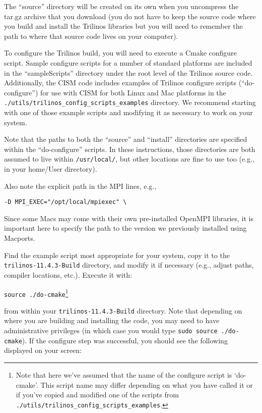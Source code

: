 The ``source'' directory will be created on its own when you uncompress the tar.gz archive 
that you download (you do not have to keep the source code where you build and install 
the Trilinos libraries but you will need to remember the path to where that source code 
lives on your computer). 

To configure the Trilinos build, you will need to execute a Cmake configure script. 
Sample configure scripts for a number of standard platforms are included in the ``sampleScripts''
 directory under the root level of the Trilinos source code. 
Additionally, the CISM code includes examples of Trilinos configure scripts (``do-configure'') 
for use with CISM for both Linux and Mac platforms in the 
\texttt{./utils/trilinos\_config\_scripts\_examples} directory. 
We recommend starting with one of those example scripts and modifying it as
necessary to work on your system.

Note that the paths to both the ``source'' and ``install'' directories are specified within the ``do-configure'' scripts. In these instructions, those directories are both assumed to live within \texttt{/usr/local/},
but other locations are fine to use too (e.g., in your home/User directory).

\begin{mdframed}[style=mac] %
Also note the explicit path in the MPI lines, e.g.,

\begin{verbatim}
-D MPI_EXEC="/opt/local/mpiexec" \
\end{verbatim}

Since some Macs may come with their own pre-installed OpenMPI libraries, it is important here to specify the path to the version we previously installed using Macports.
\end{mdframed}              %

Find the example script most appropriate for your system, copy it to the \texttt{trilinos-11.4.3-Build} directory, and modify it if necessary (e.g., adjust paths, compiler locations, etc.).
Execute it with: 

\texttt{source ./do-cmake}\footnote{Note that here we've assumed that the name of the configure script is `do-cmake'. This script name may differ depending on what you have called it or if you've copied and modified one of the scripts from \texttt{./utils/trilinos\_config\_scripts\_examples}.}

from within your \texttt{trilinos-11.4.3-Build} directory. Note that depending on where you are building and installing the code, you may need to have administrative privileges (in which case you would type \texttt{sudo source ./do-cmake}). If the configure step was successful, you should see the following displayed on your screen:


